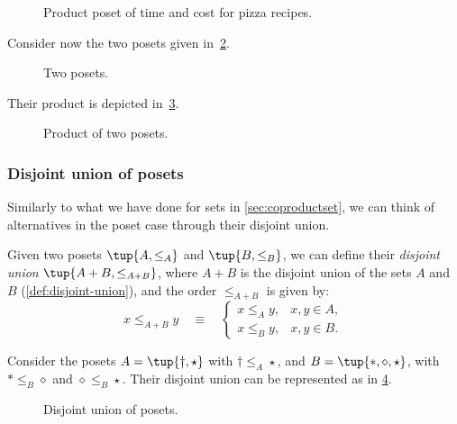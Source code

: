 \begin{figure}[h!]
\begin{center}
\end{center}
\caption{Product poset of time and cost for pizza recipes.\label{fig:productpizza}}
\end{figure}


\begin{example}
Consider now the two posets given in~\cref{fig:composing_posets_1}.
\begin{figure}[h!]
\begin{center}
\end{center}
\caption{Two posets. \label{fig:composing_posets_1}}
\end{figure}
Their product is depicted in~\cref{fig:composing_posets_2}.
\begin{figure}[h!]
\begin{center}
\end{center}
\caption{Product of two posets. \label{fig:composing_posets_2}}
\end{figure}
\end{example}

\subsubsection{Disjoint union of posets}

Similarly to what we have done for sets in \cref{sec:coproductset}, we can think of alternatives in the poset case through their disjoint union.

\begin{definition}
Given two posets $\tup{A, \leq_A} $ and $\tup{B, \leq_B} $,
we can define their \emph{disjoint union} $\tup{ A + B, \leq_{A + B}}$, where $A + B$
is the disjoint union of the sets $A$ and $B$ (\cref{def:disjoint-union}), and the
order $\leq_{A + B}$ is given by:
\begin{equation}
    x \leq_{A + B} y \quad\equiv\quad
    \begin{cases}
        x \leq_A y, & x,y \in A, \\
        x \leq_B y, & x,y \in B.
    \end{cases}
\end{equation}
\end{definition}


\begin{example}
Consider the posets $A=\tup{\dagger, \star}$ with $\dagger \leq_A \star$, and $B=\tup{\ast,\diamond,\star}$, with $\ast \leq_B \diamond$ and $\diamond \leq_B \star$. Their disjoint union can be represented as in \cref{fig:poset-coproduct}.

\begin{figure}[h!]
    \centering
    \caption{Disjoint union of posets. \label{fig:poset-coproduct}}
\end{figure}
\end{example}
